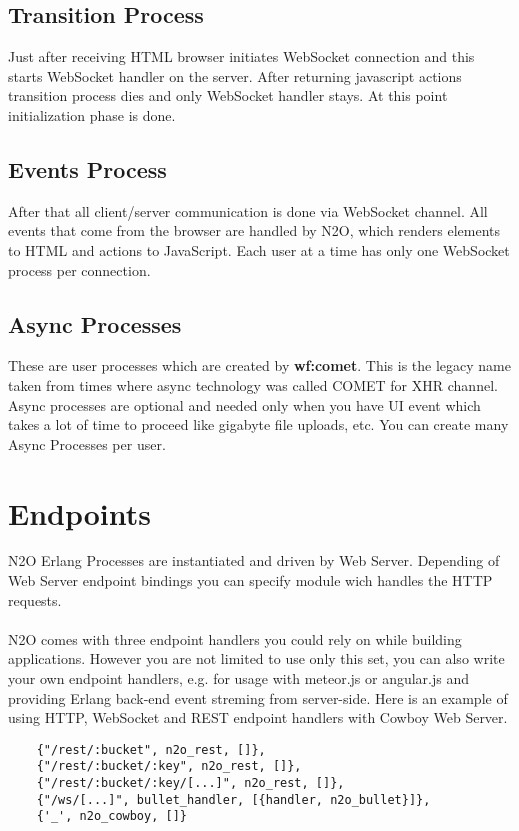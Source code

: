 \subsection{Transition Process}
Just after receiving HTML browser initiates WebSocket connection
and this starts WebSocket handler on the server. After returning
javascript actions transition process dies and only WebSocket handler stays.
At this point initialization phase is done.

\subsection{Events Process}
After that all client/server communication is done via
WebSocket channel. All events that come from the browser are
handled by N2O, which renders elements to HTML and actions to
JavaScript. Each user at a time has only one WebSocket process
per connection.

\subsection{Async Processes}
These are user processes which are created by {\bf wf:comet}.
This is the legacy name taken from times where async technology
was called COMET for XHR channel. Async processes are optional
and needed only when you have UI event which takes a lot of
time to proceed like gigabyte file uploads, etc. You can create
many Async Processes per user.

\section{Endpoints}
N2O Erlang Processes are instantiated and driven by Web Server.
Depending of Web Server endpoint bindings you can specify
module wich handles the HTTP requests.

\paragraph{}
N2O comes with three endpoint handlers you could rely on while building
applications. However you are not limited to use only this set,
you can also write your own endpoint handlers, e.g. for usage with
meteor.js or angular.js and providing Erlang back-end event streming
from server-side. Here is an example of using HTTP, WebSocket and
REST endpoint handlers with Cowboy Web Server.

\vspace{1\baselineskip}
\begin{lstlisting}
    {"/rest/:bucket", n2o_rest, []},
    {"/rest/:bucket/:key", n2o_rest, []},
    {"/rest/:bucket/:key/[...]", n2o_rest, []},
    {"/ws/[...]", bullet_handler, [{handler, n2o_bullet}]},
    {'_', n2o_cowboy, []}
\end{lstlisting}

